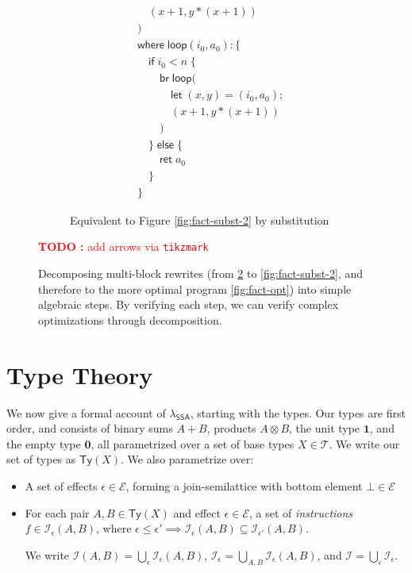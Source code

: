 \documentclass[acmsmall,screen,review]{acmart}
\newcounter{todos}
\newcommand{\TODO}[1]{{
  \stepcounter{todos}
  \begin{center}\large{\textcolor{red}{\textbf{TODO \arabic{todos}:} #1}}\end{center}
}}
\newcommand{\mc}[1]{\ensuremath{\mathcal{#1}}}
\newcommand{\mb}[1]{\ensuremath{\mathbf{#1}}}
\newcommand{\ms}[1]{\ensuremath{\mathsf{#1}}}
\newcommand{\isotopessa}{\(\lambda_{\ms{SSA}}\)}
\begin{document}
\begin{figure}
\begin{subfigure}[c]{.5\textwidth}
\begin{align*}
      & \quad(x + 1, y * (x + 1)) \\
      & ) \\
      & \ms{where}\;\ms{loop}(i_0, a_0): \{\\
      & \quad \ms{if}\;i_0 < n\;\{ \\
      & \qquad \ms{br}\;\ms{loop}( \\
      & \qquad \quad \ms{let}\;(x, y) = (i_0, a_0); \\
      & \qquad \quad (x + 1, y * (x + 1)) \\ 
      & \qquad ) \\
      & \quad \}\;\ms{else}\;\{ \\
      & \qquad \ms{ret}\;a_0 \\
      & \quad \} \\
      & \}
    \end{align*}
    \caption{Equivalent to Figure \ref{fig:fact-subst-2} by substitution}
    \label{fig:fact-zero}
  \end{subfigure}
  \TODO{add arrows via \texttt{tikzmark}}
  \caption{
    Decomposing multi-block rewrites (from \ref{fig:fact-zero} to
    \ref{fig:fact-subst-2}, and therefore to the more optimal program 
    \ref{fig:fact-opt}) into simple algebraic steps. By verifying each step, we can
    verify complex optimizations through decomposition.
  } 
  \Description{}
\end{figure}

\section{Type Theory}

We now give a formal account of \isotopessa, starting with the types. Our types are first order, and
consists of binary sums $A + B$, products $A \otimes B$, the unit type $\mathbf{1}$, and the empty
type $\mb{0}$, all parametrized over a set of base types $X \in \mc{T}$. We write our set of types
as $\ms{Ty}(X)$. We also parametrize over:
\begin{itemize}
  
  \item A set of effects $\epsilon \in \mc{E}$, forming a join-semilattice with bottom element $\bot
  \in \mc{E}$
  
  \item For each pair $A, B \in \ms{Ty}(X)$ and effect $\epsilon \in \mc{E}$, a set of
  \textit{instructions} $f \in \mc{I}_\epsilon(A, B)$, where $\epsilon \leq \epsilon' \implies
  \mc{I}_\epsilon(A, B) \subseteq \mc{I}_{\epsilon'}(A, B)$. 
  
  We write $\mc{I}(A, B) = \bigcup_\epsilon\mc{I}_\epsilon(A, B)$, $\mc{I}_\epsilon = \bigcup_{A,
  B}\mc{I}_\epsilon(A, B)$, and $\mc{I} = \bigcup_\epsilon\mc{I}_\epsilon$.

\end{itemize}
\end{document}
